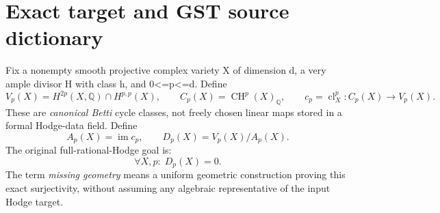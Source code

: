 \documentclass[11pt,a4paper]{article}
\newcommand{\Q}{\mathbb Q}
\newcommand{\CH}{\operatorname{CH}}
\newcommand{\cl}{\operatorname{cl}}
\newcommand{\im}{\operatorname{im}}
\begin{document}
\section{Exact target and GST source dictionary}
Fix a nonempty smooth projective complex variety X of dimension d,
a very ample divisor H with class h, and 0<=p<=d.  Define
\[
 V_p(X)=H^{2p}(X,\Q)\cap H^{p,p}(X),\qquad
 C_p(X)=\CH^p(X)_\Q,\qquad
 c_p=\cl_X^p:C_p(X)\longrightarrow V_p(X).
\]
These are \emph{canonical Betti} cycle classes, not freely chosen
linear maps stored in a formal Hodge-data field.  Define
\[
 A_p(X)=\im c_p,\qquad D_p(X)=V_p(X)/A_p(X).
 \tag{1.1}\label{eq:defect}
\]
The original full-rational-Hodge goal is:
\[
 \boxed{\forall X,p:\;D_p(X)=0.}\tag{1.2}\label{eq:target}
\]
The term \emph{missing geometry} means a uniform geometric
construction proving this exact surjectivity, without assuming
any algebraic representative of the input Hodge target.
\end{document}

